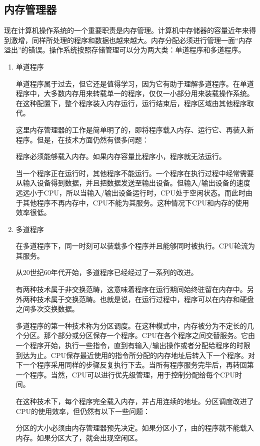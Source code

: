 \subsection{内存管理器}
现在计算机操作系统的一个重要职责是内存管理。计算机中存储器的容量近年来得到激增，同样所处理的程序和数据也越来越大。内存分配必须进行管理一面“内存溢出”的错误。操作系统按照存储管理可以分为两大类：单道程序和多道程序。
\begin{enumerate}
	\item 单道程序

	单道程序属于过去，但它还是值得学习，因为它有助于理解多道程序。在单道程序中，大多数内存用来转载单一的程序，仅仅一小部分用来装载操作系统。在这种配置下，整个程序装入内存运行，运行结束后，程序区域由其他程序取代。

	这里内存管理器的工作是简单明了的，即将程序载入内存、运行它、再装入新程序。但是，在技术方面仍然有很多问题：

	程序必须能够载入内存。如果内存容量比程序小，程序就无法运行。

	当一个程序正在运行时，其他程序不能运行。一个程序在执行过程中经常需要从输入设备得到数据，并且把数据发送至输出设备。但输入/输出设备的速度远远小于CPU，所以当输入/输出设备运行时，CPU处于空闲状态。而此时由于其他程序不再内存中，CPU不能为其服务。这种情况下CPU和内存的使用效率很低。

	\item 多道程序

	在多道程序下，同一时刻可以装载多个程序并且能够同时被执行。CPU轮流为其服务。

	从20世纪60年代开始，多道程序已经经过了一系列的改进。

	有两种技术属于非交换范畴，这意味着程序在运行期间始终驻留在内存中。另外两种技术属于交换范畴。也就是说，在运行过程中，程序可以在内存和硬盘之间多次交换数据。

	多道程序的第一种技术称为分区调度。在这种模式中，内存被分为不定长的几个分区。那个部分或分区保存一个程序。CPU在各个程序之间交替服务。它由一个程序开始，执行一些指令，直到有输入/输出操作或者分配给程序的时限到达为止。CPU保存最近使用的指令所分配的内存地址后转入下一个程序。对下一个程序采用同样的步骤反复执行下去。当所有程序服务完毕后，再转回第一个程序。当然，CPU可以进行优先级管理，用于控制分配给每个CPU时间。

	在这种技术下，每个程序完全载入内存，并占用连续的地址。分区调度改进了CPU的使用效率，但仍然有以下一些问题：

	分区的大小必须由内存管理器预先决定。如果分区小了，由的程序就不能载入内存。如果分区大了，就会出现空闲区。


\end{enumerate}
